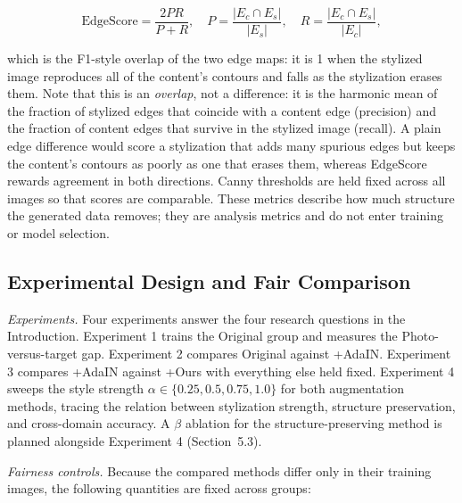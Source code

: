 \[
\text{EdgeScore} = \frac{2PR}{P+R}, \quad
P = \frac{|E_c \cap E_s|}{|E_s|}, \quad
R = \frac{|E_c \cap E_s|}{|E_c|},
\]

which is the F1-style overlap of the two edge maps: it is 1 when the stylized image reproduces all of the content's contours and falls as the stylization erases them. Note that this is an \textit{overlap}, not a difference: it is the harmonic mean of the fraction of stylized edges that coincide with a content edge (precision) and the fraction of content edges that survive in the stylized image (recall). A plain edge difference would score a stylization that adds many spurious edges but keeps the content's contours as poorly as one that erases them, whereas EdgeScore rewards agreement in both directions. Canny thresholds are held fixed across all images so that scores are comparable. These metrics describe how much structure the generated data removes; they are analysis metrics and do not enter training or model selection.


\subsection{Experimental Design and Fair Comparison}
\label{sec:exp_design}

\textit{Experiments.} Four experiments answer the four research questions in the Introduction. Experiment 1 trains the Original group and measures the Photo-versus-target gap. Experiment 2 compares Original against +AdaIN. Experiment 3 compares +AdaIN against +Ours with everything else held fixed. Experiment 4 sweeps the style strength $\alpha \in \{0.25, 0.5, 0.75, 1.0\}$ for both augmentation methods, tracing the relation between stylization strength, structure preservation, and cross-domain accuracy. A $\beta$ ablation for the structure-preserving method is planned alongside Experiment 4 (Section~5.3).

\textit{Fairness controls.} Because the compared methods differ only in their training images, the following quantities are fixed across groups:

